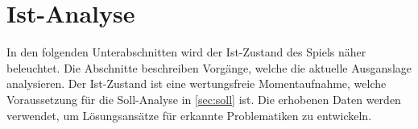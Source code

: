 \section{Ist-Analyse}\label{sec:ist}
In den folgenden Unterabschnitten wird der Ist-Zustand des Spiels näher beleuchtet\cite{grundlagen-grochla}.
Die Abschnitte beschreiben Vorgänge, welche die aktuelle Ausganslage analysieren.
Der Ist-Zustand ist eine wertungsfreie Momentaufnahme, welche Voraussetzung für die Soll-Analyse in \autoref{sec:soll} ist\cite{ist-zustand}.
Die erhobenen Daten werden verwendet, um Lösungsansätze für erkannte Problematiken zu entwickeln. 
